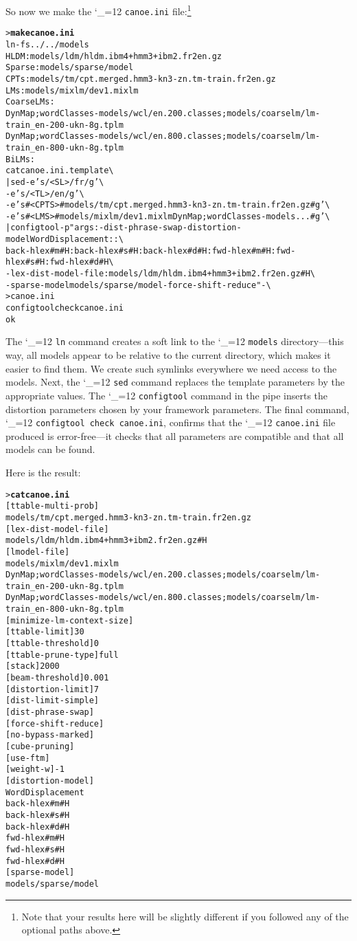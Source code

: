 \documentclass[11pt,letterpaper]{article}
\newcommand{\bs}{\textbackslash{}}
\def\code{\begingroup\catcode`\_=12 \codex}
\newcommand{\codex}[1]{\texttt{#1}\endgroup}
\begin{document}
So now we make the \code{canoe.ini} file:\footnote{Note that your results here
will be slightly different if you followed any of the optional paths above.}
\begin{small}
\begin{alltt}
   > \textbf{make canoe.ini}
   ln -fs ../../models
   HLDM: models/ldm/hldm.ibm4+hmm3+ibm2.fr2en.gz
   Sparse: models/sparse/model
   CPTs: models/tm/cpt.merged.hmm3-kn3-zn.tm-train.fr2en.gz
   LMs: models/mixlm/dev1.mixlm
   Coarse LMs:
      DynMap;wordClasses-models/wcl/en.200.classes;models/coarselm/lm-train_en-200-ukn-8g.tplm
      DynMap;wordClasses-models/wcl/en.800.classes;models/coarselm/lm-train_en-800-ukn-8g.tplm  
   BiLMs:
   cat canoe.ini.template \bs
      | sed -e 's/<SL>/fr/g' \bs
            -e 's/<TL>/en/g' \bs
            -e 's#<CPTS>#models/tm/cpt.merged.hmm3-kn3-zn.tm-train.fr2en.gz#g' \bs
            -e 's#<LMS>#models/mixlm/dev1.mixlm DynMap;wordClasses-models...#g' \bs
      | configtool -p "args: -dist-phrase-swap -distortion-model WordDisplacement::\bs
        back-hlex#m#H:back-hlex#s#H:back-hlex#d#H:fwd-hlex#m#H:fwd-hlex#s#H:fwd-hlex#d#H \bs
        -lex-dist-model-file :models/ldm/hldm.ibm4+hmm3+ibm2.fr2en.gz#H \bs
        -sparse-model models/sparse/model -force-shift-reduce " - \bs
      > canoe.ini
   configtool check canoe.ini
   ok
\end{alltt}
\end{small}
The \code{ln} command creates a soft link to the \code{models} directory---this way, all
models appear to be relative to the current directory, which makes it easier to
find them.  We create such symlinks everywhere we need access to the models.
Next, the \code{sed} command replaces the template parameters by the appropriate
values.  The \code{configtool} command in the pipe inserts the distortion parameters
chosen by your framework parameters.  The final command, \code{configtool check
canoe.ini}, confirms that the \code{canoe.ini} file produced is error-free---it
checks that all parameters are compatible and that all models can be found.

Here is the result:
\begin{small}
\begin{alltt}
   > \textbf{cat canoe.ini}
   [ttable-multi-prob]
      models/tm/cpt.merged.hmm3-kn3-zn.tm-train.fr2en.gz
   [lex-dist-model-file]
      models/ldm/hldm.ibm4+hmm3+ibm2.fr2en.gz#H
   [lmodel-file]
      models/mixlm/dev1.mixlm
      DynMap;wordClasses-models/wcl/en.200.classes;models/coarselm/lm-train_en-200-ukn-8g.tplm
      DynMap;wordClasses-models/wcl/en.800.classes;models/coarselm/lm-train_en-800-ukn-8g.tplm
   [minimize-lm-context-size]
   [ttable-limit] 30
   [ttable-threshold] 0
   [ttable-prune-type] full
   [stack] 2000
   [beam-threshold] 0.001
   [distortion-limit] 7
   [dist-limit-simple]
   [dist-phrase-swap]
   [force-shift-reduce]
   [no-bypass-marked]
   [cube-pruning]
   [use-ftm]
   [weight-w] -1
   [distortion-model]
      WordDisplacement
      back-hlex#m#H
      back-hlex#s#H
      back-hlex#d#H
      fwd-hlex#m#H
      fwd-hlex#s#H
      fwd-hlex#d#H
   [sparse-model]
      models/sparse/model
\end{alltt}
\end{small}
\end{document}
